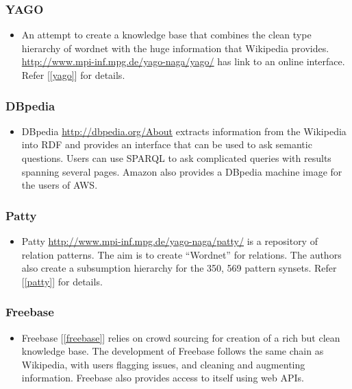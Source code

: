 \subsubsection{YAGO}
\begin{itemize}
 \item An attempt to create a knowledge base that combines the clean type hierarchy of 
 wordnet with the huge information that Wikipedia provides. \url{http://www.mpi-inf.mpg.de/yago-naga/yago/}
 has link to an online interface. Refer [\ref{yago}] for details. 
\end{itemize}

 \subsubsection{DBpedia}
 \begin{itemize}
  \item DBpedia \url{http://dbpedia.org/About} extracts information from the Wikipedia into RDF and provides 
  an interface that can be used to ask semantic questions. Users can use SPARQL to ask complicated queries 
  with results spanning several pages. Amazon also provides a DBpedia machine image for the users of AWS.
 \end{itemize}

 \subsubsection{Patty}
 \begin{itemize}
  \item  Patty \url{http://www.mpi-inf.mpg.de/yago-naga/patty/} is a repository of relation patterns. The aim is to 
  create ``Wordnet'' for relations. The authors also create a subsumption hierarchy for the 350, 569 pattern synsets.
  Refer [\ref{patty}] for details.  
 \end{itemize}

\subsubsection{Freebase}
 \begin{itemize}
\item Freebase [\ref{freebase}] relies on crowd sourcing for creation of a rich but clean knowledge base.
The development of Freebase follows the same chain as Wikipedia, with users flagging issues, and
cleaning and augmenting information. Freebase also provides access to itself using web APIs.
\end{itemize}

